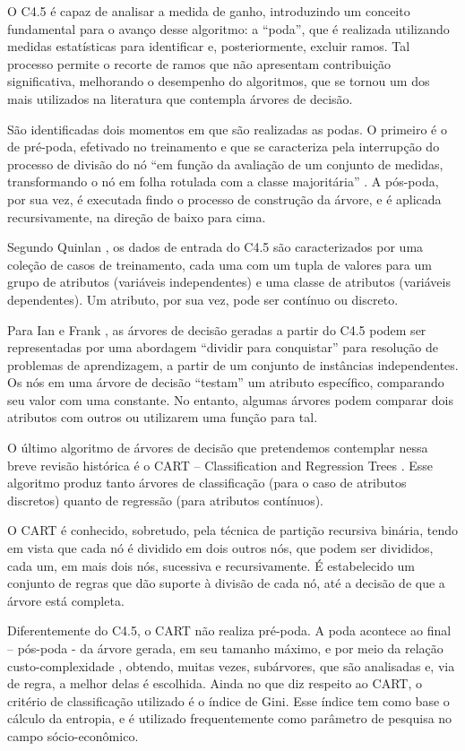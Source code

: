 O C4.5 é capaz de analisar a medida de ganho, introduzindo um conceito fundamental para o avanço desse algoritmo: a “poda”, que é realizada utilizando medidas estatísticas para identificar e, posteriormente, excluir ramos. Tal processo permite o recorte de ramos que não apresentam contribuição significativa, melhorando o desempenho do algoritmos, que se tornou um dos  mais utilizados na literatura que contempla árvores de decisão. 

São identificadas dois momentos em que são realizadas as podas. O primeiro é o de pré-poda, efetivado no treinamento e que se caracteriza pela interrupção do processo de divisão do nó “em função da avaliação de um conjunto de medidas, transformando o nó em folha rotulada com a classe majoritária” \cite{Simoes2008}. A pós-poda, por sua vez, é executada findo o processo de construção da árvore, e é aplicada recursivamente, na direção de baixo para cima.

Segundo Quinlan \cite{Kohavi99decisiontree}, os dados de entrada do C4.5 são caracterizados por uma coleção de casos de treinamento, cada uma com um tupla de valores para um grupo de atributos (variáveis independentes) e uma classe de atributos (variáveis dependentes). Um atributo, por sua vez, pode ser contínuo ou discreto.

Para Ian e Frank \cite{MachineLearning}, as árvores de decisão geradas a partir do C4.5 podem ser representadas por uma abordagem ``dividir para conquistar'' para resolução de problemas de 
aprendizagem, a partir de um conjunto de instâncias independentes. Os nós em uma árvore de decisão ``testam'' um atributo específico, comparando seu valor com uma constante. No entanto, algumas árvores podem comparar dois atributos com outros ou utilizarem uma função para tal.

O último algoritmo de árvores de decisão que pretendemos contemplar nessa breve revisão histórica é o CART – Classification and Regression Trees \cite{breiman1984}. Esse algoritmo produz tanto árvores de classificação (para o caso de atributos discretos) quanto de regressão (para atributos contínuos). 

O CART é conhecido, sobretudo, pela técnica de partição recursiva binária, tendo em vista que cada nó é dividido em dois outros nós, que podem ser divididos, cada um, em mais dois nós, sucessiva e recursivamente. É estabelecido um conjunto de regras que dão suporte à divisão de cada nó, até a decisão de que a árvore está completa.

Diferentemente do C4.5, o CART não realiza pré-poda. A poda acontece ao final – pós-poda - da árvore gerada, em seu tamanho máximo, e por meio da relação custo-complexidade \cite{breiman1984}, obtendo, muitas vezes, subárvores, que são analisadas e, via de regra, a melhor delas é escolhida.
Ainda no que diz respeito ao CART, o critério de classificação utilizado é o índice de Gini. Esse índice tem como base o cálculo da entropia, e é utilizado frequentemente como parâmetro de pesquisa no campo sócio-econômico.

